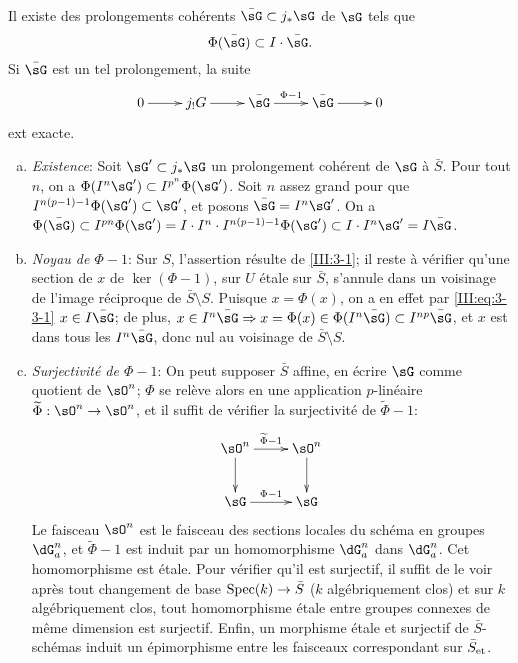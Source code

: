 \begin{lemma_}\label{III:3-3}
Il existe des prolongements cohérents $\bar\sG\subset j_*\sG$ de $\sG$ tels 
que 
\begin{equation}\label{III:eq:3-3-1}
  \Phi(\bar\sG)\subset I\cdot \bar\sG\text{.}
\end{equation}
Si $\bar\sG$ est un tel prolongement, la suite 
\begin{equation}\label{III:eq:3-3-2}
\xymatrix{
  0 \ar[r] 
    & j_! G \ar[r] 
    & \bar\sG \ar[r]^-{\Phi-1} 
    & \bar\sG \ar[r] 
    & 0
}
\end{equation}
ext exacte.
\end{lemma_}
\begin{enumerate}[a)]
  \item \emph{Existence}: Soit $\sG'\subset j_*\sG$ un prolongement cohérent 
    de $\sG$ à $\bar S$. Pour tout $n$, on a 
    $\Phi(I^n \sG')\subset I^{p^n}\Phi(\sG')$. Soit $n$ assez grand pour 
    que $I^{n(p-1)-1}\Phi(\sG')\subset \sG'$, et posons $\bar\sG=I^n\sG'$. 
    On a $\Phi(\bar\sG)\subset I^{p n}\Phi(\sG') 
    =I\cdot I^n\cdot I^{n(p-1)-1}\Phi(\sG')\subset I\cdot I^n\sG' 
    = I\bar\sG$. 
  \item \emph{Noyau de $\Phi-1$}: Sur $S$, l'assertion résulte de 
    \ref{III:3-1}; il reste à vérifier qu'une section de $x$ de 
    $\ker(\Phi-1)$, sur $U$ étale sur $\bar S$, s'annule dans un voisinage de 
    l'image réciproque de $\bar S\setminus S$. Puisque $x=\Phi(x)$, on a en 
    effet par \eqref{III:eq:3-3-1} $x\in I\bar\sG$; de plus, 
    $x\in I^n\bar\sG\Rightarrow x=\Phi(x)\in\Phi(I^n\bar\sG)\subset I^{n p}\bar\sG$, et $x$ est dans tous les $I^n\bar\sG$, donc nul au voisinage de 
    $\bar S\setminus S$.
  \item \emph{Surjectivité de $\Phi-1$}: On peut supposer $\bar S$ affine, en 
    écrire $\sG$ comme quotient de $\sO^n$; $\Phi$ se relève alors en une 
    application $p$-linéaire $\widetilde\Phi:\sO^n\to\sO^n$, et il suffit de 
    vérifier la surjectivité de $\widetilde\Phi-1$:
    \[\xymatrix{
      \sO^n \ar[r]^-{\widetilde \Phi-1} \ar[d] 
        & \sO^n \ar[d] \\
      \sG \ar[r]^-{\Phi-1} 
        & \sG 
    }\]
    Le faisceau $\sO^n$ est le faisceau des sections locales du schéma en 
    groupes $\dG_a^n$, et $\widetilde\Phi-1$ est induit par un homomorphisme 
    $\dG_a^n$ dans $\dG_a^n$. Cet homomorphisme est étale. Pour vérifier 
    qu'il est surjectif, il suffit de le voir après tout changement de base 
    $\operatorname{Spec}(k)\to\bar S$ ($k$ algébriquement clos) et sur $k$ algébriquement 
    clos, tout homomorphisme étale entre groupes connexes de même dimension 
    est surjectif. Enfin, un morphisme étale et surjectif de 
    $\bar S$-schémas induit un épimorphisme entre les faisceaux 
    correspondant sur ${\bar S}_{\textnormal{et}}$.
\end{enumerate}





